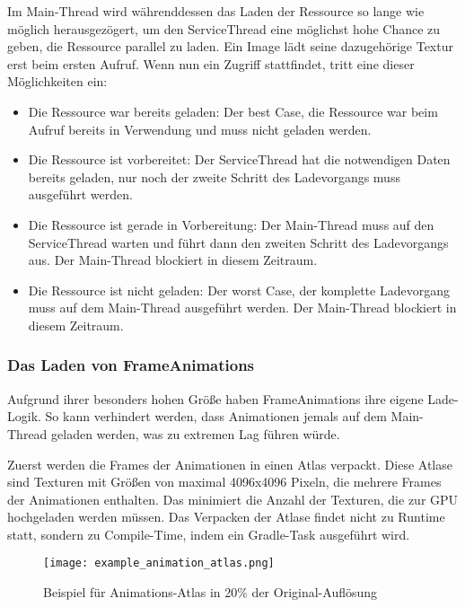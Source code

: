 Im Main-Thread wird währenddessen das Laden der Ressource so lange wie möglich herausgezögert, um den ServiceThread
eine möglichst hohe Chance zu geben, die Ressource parallel zu laden.
Ein Image \zB lädt seine dazugehörige Textur erst beim ersten  Aufruf.
Wenn nun ein Zugriff stattfindet, tritt eine dieser Möglichkeiten ein:

\begin{itemize}
    \item Die Ressource war bereits geladen: Der best Case, die Ressource war beim  Aufruf bereits
        in Verwendung und muss nicht geladen werden.
    \item Die Ressource ist vorbereitet: Der ServiceThread hat die notwendigen Daten bereits geladen, nur noch der
        zweite Schritt des Ladevorgangs muss ausgeführt werden.
    \item Die Ressource ist gerade in Vorbereitung: Der Main-Thread muss auf den ServiceThread warten und führt dann
        den zweiten Schritt des Ladevorgangs aus.
        Der Main-Thread blockiert in diesem Zeitraum.
    \item Die Ressource ist nicht geladen: Der worst Case, der komplette Ladevorgang muss auf dem Main-Thread ausgeführt
        werden.
        Der Main-Thread blockiert in diesem Zeitraum.
\end{itemize}

\subsubsection{Das Laden von FrameAnimations}

Aufgrund ihrer besonders hohen Größe haben FrameAnimations ihre eigene Lade-Logik.
So kann verhindert werden, dass Animationen jemals auf dem Main-Thread geladen werden, was zu extremen Lag führen würde.

Zuerst werden die Frames der Animationen in einen Atlas verpackt.
Diese Atlase sind Texturen mit Größen von maximal 4096x4096 Pixeln, die mehrere Frames der Animationen enthalten.
Das minimiert die Anzahl der Texturen, die zur GPU hochgeladen werden müssen.
Das Verpacken der Atlase findet nicht zu Runtime statt, sondern zu Compile-Time, indem ein Gradle-Task ausgeführt wird.

\begin{figure}[H]
    \texttt{[image: example\_animation\_atlas.png]}
    \caption{Beispiel für Animations-Atlas in 20\% der Original-Auflösung}
\end{figure}

